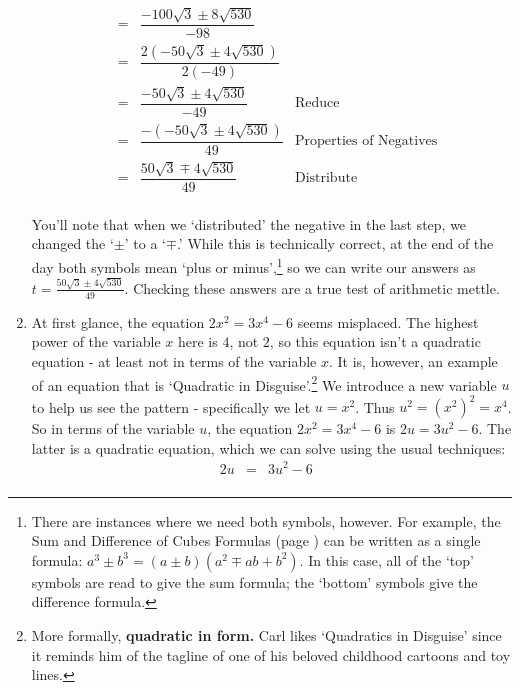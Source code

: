 \documentclass{ximera}
\begin{document}
\begin{example}
\begin{enumerate}
\[\begin{array}{rclr}
& = &  \dfrac{-100\sqrt{3} \pm 8\sqrt{530}}{-98}  & \\ [10pt]

& = &  \dfrac{2(-50\sqrt{3} \pm 4\sqrt{530})}{2(-49)}  & \\ [10pt]

& = &  \dfrac{-50\sqrt{3} \pm 4\sqrt{530}}{-49}  & \text{Reduce} \\ [10pt]

& = &  \dfrac{-(-50\sqrt{3} \pm 4\sqrt{530})}{49}  & \text{Properties of Negatives} \\ [10pt]

& = & \dfrac{50\sqrt{3} \mp 4\sqrt{530}}{49} & \text{Distribute} \\ 

\end{array}\]

You'll note that when we `distributed' the negative in the last step, we changed the `$\pm$' to a `$\mp$.'  While this is technically correct, at the end of the day both symbols mean `plus or minus',\footnote{There are instances where we need both symbols, however.  For example, the Sum and Difference of Cubes Formulas (page \pageref{CommonFactoringFormulas}) can be written as a single formula:  $a^3 \pm b^3 = (a \pm b) (a^2 \mp ab + b^2)$.  In this case, all of the `top' symbols are read to give the sum formula;  the `bottom' symbols give the difference formula.} so we can write our answers as $t =  \frac{50\sqrt{3} \pm 4\sqrt{530}}{49}$. Checking these answers are a true test of arithmetic mettle.

\item At first glance, the equation $2x^2 = 3x^4 - 6$ seems misplaced.  The highest power of the variable $x$ here is $4$, not $2$, so this equation isn't a quadratic equation - at least not in terms of the variable $x$.  It is, however, an example of an equation that is `Quadratic in Disguise'.\footnote{More formally, \textbf{quadratic in form.} Carl likes `Quadratics in Disguise' since it reminds him of the tagline of one of his beloved childhood cartoons and toy lines.} We introduce a new variable $u$ to help us see the pattern - specifically we let $u = x^2$.  Thus $u^2 = (x^2)^2 = x^4$.  So in terms of the variable $u$, the equation $2x^2 = 3x^4 - 6$ is $2u = 3u^2 - 6$.  The latter is a quadratic equation, which we can solve using the usual techniques:\[ \begin{array}{rclr}

2u & = & 3u^2 - 6 & \\


\end{array}\]
\end{enumerate}
\end{example}
\end{document}
